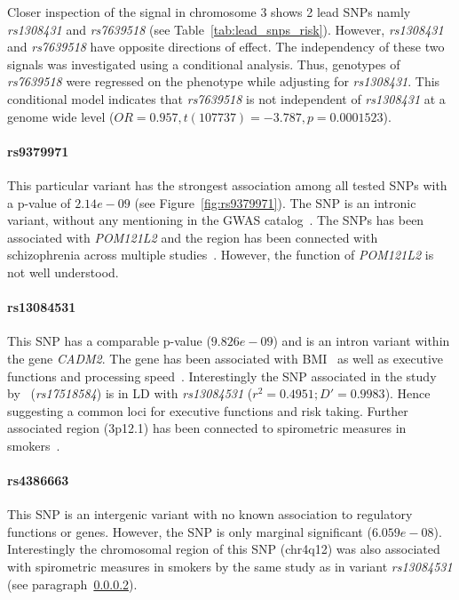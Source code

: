 Closer inspection of the signal in chromosome 3 shows 2 lead SNPs namly \textit{rs1308431} and \textit{rs7639518} (see Table~\ref{tab:lead_snps_risk}).
However, \textit{rs1308431} and \textit{rs7639518} have opposite directions of effect.
The independency of these two signals was investigated using a conditional analysis.
Thus, genotypes of \textit{rs7639518} were regressed on the phenotype while adjusting for \textit{rs1308431}.
This conditional model indicates that \textit{rs7639518} is not independent of \textit{rs1308431} at a genome wide level ($OR=0.957, t(107737)=-3.787, p=0.0001523$).

\paragraph{rs9379971}
\label{par:rs9379971}
This particular variant has the strongest association among all tested SNPs with a p-value of $2.14e-09$ (see Figure~\ref{fig:rs9379971}). 
The SNP is an intronic variant, without any mentioning in the GWAS catalog~\cite{Welter2014}.
The SNPs has been associated with \textit{POM121L2} and the region has been connected with schizophrenia across multiple studies~\cite{Aberg2013,Shi2009}.
However, the function of \textit{POM121L2} is not well understood.

\paragraph{rs13084531}
\label{par:rs13084531}
This SNP has a comparable p-value ($9.826e-09$) and is an intron variant within the gene \textit{CADM2}.
The gene has been associated with BMI~\cite{Speliotes2010} as well as executive functions and processing speed~\cite{Ibrahim-Verbaas2015}.
Interestingly the SNP associated in the study by~\cite{Ibrahim-Verbaas2015} (\textit{rs17518584}) is in LD with \textit{rs13084531} ($r^2=0.4951;D'=0.9983$).
Hence suggesting a common loci for executive functions and risk taking.
Further associated region (3p12.1) has been connected to spirometric measures in smokers~\cite{Lutz2015}.

\paragraph{rs4386663}
\label{par:rs4386663}
This SNP is an intergenic variant with no known association to regulatory functions or genes.
However, the SNP is only marginal significant ($6.059e-08$).
Interestingly the chromosomal region of this SNP (chr4q12) was also associated with spirometric measures in smokers by the same study as in variant \textit{rs13084531} (see paragraph~\ref{par:rs13084531}).

